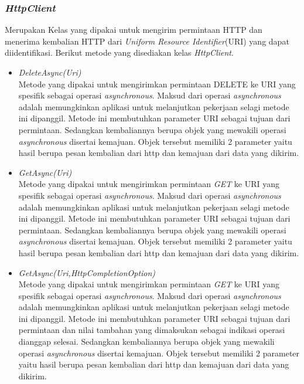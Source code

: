 \subsubsection{\textit{HttpClient}}
\label{subsubsec:Kelas HttpClient}
\hspace{0.5cm} Merupakan Kelas yang dipakai untuk mengirim permintaan HTTP dan menerima kembalian HTTP dari \textit{Uniform Resource Identifier}(URI) yang dapat diidentifikasi. Berikut metode yang disediakan kelas \textit{HttpClient}.
\begin{itemize}
	\item \textit{DeleteAsync(Uri)} \\
	Metode yang dipakai untuk mengirimkan permintaan DELETE ke URI yang spesifik sebagai operasi \textit{asynchronous}. Maksud dari operasi \textit{asynchronous} adalah memungkinkan aplikasi untuk melanjutkan pekerjaan selagi metode ini dipanggil\footnotemark[2]. Metode ini membutuhkan parameter URI sebagai tujuan dari permintaan. Sedangkan kembaliannya berupa objek yang mewakili operasi \textit{asynchronous} disertai kemajuan. Objek tersebut memiliki 2 parameter yaitu hasil berupa pesan kembalian dari http dan kemajuan dari data yang dikirim.
	\item \textit{GetAsync(Uri)} \\
	Metode yang dipakai untuk mengirimkan permintaan \textit{GET} ke URI yang spesifik sebagai operasi \textit{asynchronous}. Maksud dari operasi \textit{asynchronous} adalah memungkinkan aplikasi untuk melanjutkan pekerjaan selagi metode ini dipanggil\footnotemark[2]. Metode ini membutuhkan parameter URI sebagai tujuan dari permintaan. Sedangkan kembaliannya berupa objek yang mewakili operasi \textit{asynchronous} disertai kemajuan. Objek tersebut memiliki 2 parameter yaitu hasil berupa pesan kembalian dari http dan kemajuan dari data yang dikirim.
	\item \textit{GetAsync(Uri,HttpCompletionOption)} \\
	Metode yang dipakai untuk mengirimkan permintaan \textit{GET} ke URI yang spesifik sebagai operasi \textit{asynchronous}. Maksud dari operasi \textit{asynchronous} adalah memungkinkan aplikasi untuk melanjutkan pekerjaan selagi metode ini dipanggil\footnotemark[2]. Metode ini membutuhkan parameter URI sebagai tujuan dari permintaan dan nilai tambahan yang dimaksukan sebagai indikasi operasi dianggap selesai. Sedangkan kembaliannya berupa objek yang mewakili operasi \textit{asynchronous} disertai kemajuan. Objek tersebut memiliki 2 parameter yaitu hasil berupa pesan kembalian dari http dan kemajuan dari data yang dikirim.

\end{itemize}
